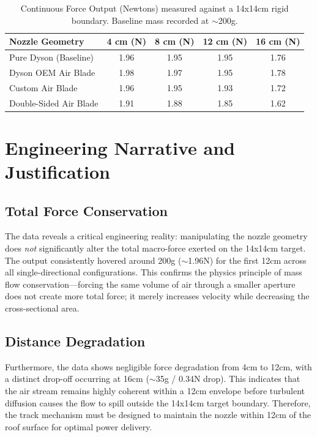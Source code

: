 \documentclass{article}
\begin{document}
\begin{table}[h]
\centering
\begin{tabular}{@{}lcccc@{}}
\toprule
\textbf{Nozzle Geometry} & \textbf{4 cm (N)} & \textbf{8 cm (N)} & \textbf{12 cm (N)} & \textbf{16 cm (N)} \\ \midrule
Pure Dyson (Baseline)    & 1.96              & 1.95              & 1.95               & 1.76               \\
Dyson OEM Air Blade      & 1.98              & 1.97              & 1.95               & 1.78               \\
Custom Air Blade         & 1.96              & 1.95              & 1.93               & 1.72               \\
Double-Sided Air Blade   & 1.91              & 1.88              & 1.85               & 1.62               \\ \bottomrule
\end{tabular}
\caption{Continuous Force Output (Newtons) measured against a 14x14cm rigid boundary. Baseline mass recorded at $\sim$200g.}
\end{table}

\section{Engineering Narrative and Justification}
\subsection{Total Force Conservation}
The data reveals a critical engineering reality: manipulating the nozzle geometry does \textit{not} significantly alter the total macro-force exerted on the 14x14cm target. The output consistently hovered around 200g ($\sim$1.96N) for the first 12cm across all single-directional configurations. This confirms the physics principle of mass flow conservation---forcing the same volume of air through a smaller aperture does not create more total force; it merely increases velocity while decreasing the cross-sectional area. 

\subsection{Distance Degradation}
Furthermore, the data shows negligible force degradation from 4cm to 12cm, with a distinct drop-off occurring at 16cm ($\sim$35g / 0.34N drop). This indicates that the air stream remains highly coherent within a 12cm envelope before turbulent diffusion causes the flow to spill outside the 14x14cm target boundary. Therefore, the track mechanism must be designed to maintain the nozzle within 12cm of the roof surface for optimal power delivery.
\end{document}
